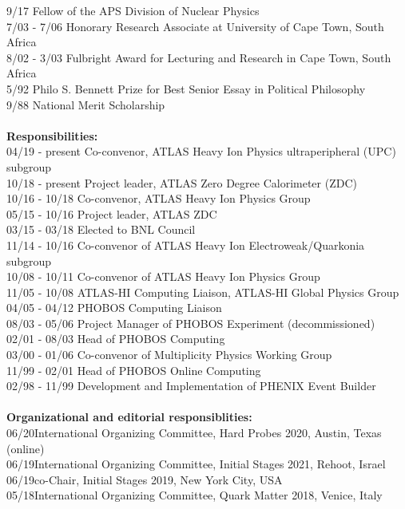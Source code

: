 \documentclass[11 pt]{article}
\begin{document}
\begin{tabbing}
9/17 \> Fellow of the APS Division of Nuclear Physics\\
7/03 - 7/06 \> Honorary Research Associate at University of Cape Town, South Africa \\
8/02 - 3/03 \> Fulbright Award for Lecturing and Research in Cape Town, South Africa\\
5/92 \> Philo S. Bennett Prize for Best Senior Essay in Political Philosophy \\
9/88 \> National Merit Scholarship \\
\\
\textbf{Responsibilities:}\\
04/19 - present \> Co-convenor, ATLAS Heavy Ion Physics ultraperipheral (UPC) subgroup\\
10/18 - present \> Project leader, ATLAS Zero Degree Calorimeter (ZDC)\\
10/16 - 10/18 \> Co-convenor, ATLAS Heavy Ion Physics Group \\
05/15 - 10/16 \> Project leader, ATLAS ZDC\\
03/15 - 03/18 \> Elected to BNL Council \\
11/14 - 10/16 \> Co-convenor of ATLAS Heavy Ion Electroweak/Quarkonia subgroup\\
10/08 - 10/11 \> Co-convenor of ATLAS Heavy Ion Physics Group\\
11/05 - 10/08 \> ATLAS-HI Computing Liaison, ATLAS-HI Global Physics Group \\
04/05 - 04/12 \> PHOBOS Computing Liaison \\
08/03 - 05/06 \> Project Manager of PHOBOS Experiment (decommissioned)\\
02/01 - 08/03 \> Head of PHOBOS Computing\\
03/00 - 01/06 \> Co-convenor of Multiplicity Physics Working Group\\
11/99 - 02/01 \> Head of PHOBOS Online Computing\\
02/98 - 11/99 \> Development and Implementation of PHENIX Event Builder\\
\\
\textbf{Organizational and editorial responsiblities:}\\
06/20\>International Organizing Committee, Hard Probes 2020, Austin, Texas (online)\\
06/19\>International Organizing	Committee, Initial Stages 2021, Rehoot, Israel\\
06/19\>co-Chair, Initial Stages 2019, New York City, USA\\
05/18\>International Organizing Committee, Quark Matter 2018, Venice, Italy\\

\end{tabbing}
\end{document}
